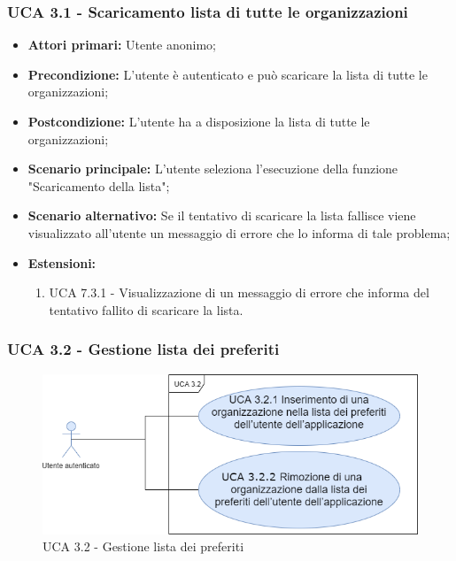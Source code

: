 \subsubsection{UCA 3.1 - Scaricamento lista di tutte le organizzazioni}%
\begin{itemize}
\item \textbf{Attori primari:} Utente anonimo;
\item \textbf{Precondizione:} L'utente è autenticato e può scaricare la lista di tutte le organizzazioni;
\item \textbf{Postcondizione:} L'utente ha a disposizione la lista di tutte le organizzazioni;
\item \textbf{Scenario principale:} L'utente seleziona l'esecuzione della funzione "Scaricamento della lista";
\item \textbf{Scenario alternativo:}  Se il tentativo di scaricare la lista fallisce viene visualizzato all'utente un messaggio di errore che lo informa di tale problema;
\item \textbf{Estensioni:}
	\begin{enumerate}
	\item UCA 7.3.1 - Visualizzazione di un messaggio di errore che informa del tentativo fallito di scaricare la lista.
\end{enumerate}
  
\end{itemize}


\subsubsection{UCA 3.2 - Gestione lista dei preferiti}%

\begin{figure}[h]
	\centering
	
	\includegraphics[scale=0.5]{sezioni/UseCase/Immagini/UCA3.2.png}
	\caption{UCA 3.2 - Gestione lista dei preferiti}
\end{figure}


